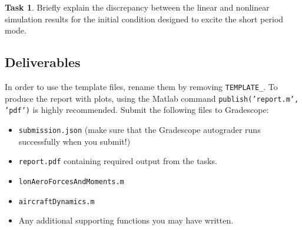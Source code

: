 \documentclass{article}
\theoremstyle{definition}
\newtheorem{task}{Task}
\begin{document}
\begin{task}
    Briefly explain the discrepancy between the linear and nonlinear simulation results for the initial condition designed to excite the short period mode.
\end{task}

\subsection*{Deliverables}
In order to use the template files, rename them by removing \texttt{TEMPLATE\_}. To produce the report with plots, using the Matlab command \texttt{publish('report.m', 'pdf')} is highly recommended. Submit the following files to Gradescope:

\begin{itemize}[noitemsep]
    \item \texttt{submission.json} (make sure that the Gradescope autograder runs successfully when you submit!)
    \item \texttt{report.pdf} containing required output from the tasks.
    \item \texttt{lonAeroForcesAndMoments.m}
    \item \texttt{aircraftDynamics.m}
    \item Any additional supporting functions you may have written.
\end{itemize}
\end{document}
